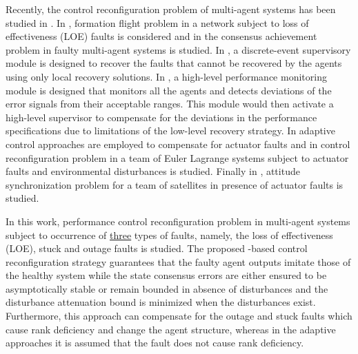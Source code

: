 \documentclass[12pt,draftcls,onecolumn]{IEEEtran}
\begin{document}
Recently, the control reconfiguration problem of multi-agent systems has been studied in  \cite{Tousi2012,Azizi11,ACC2014,ECC2014,Zhou2014,Zhao2014,Chen2014,Wang2015-2,Wang2015-3,Mehrabian2011,Mehrabian2011-2,Li2012,Xiao2013}. In \cite{Tousi2012,Azizi11}, formation flight problem in a network subject to loss of effectiveness (LOE) faults is considered and in  \cite{ACC2014,ECC2014,Zhou2014} the consensus achievement problem in faulty multi-agent systems is studied.  In  \cite{Tousi2012}, a discrete-event supervisory module is designed to recover the faults that cannot be recovered by the agents using only local recovery solutions. In \cite{Azizi11}, a  high-level performance monitoring  module is designed  that monitors all the agents and detects deviations of the error signals from their acceptable ranges. This module would then activate a high-level supervisor to compensate for the deviations in the performance specifications due to limitations of the low-level recovery strategy. In \cite{Zhao2014,Chen2014,Wang2015-2,Wang2015-3} adaptive control approaches are employed to compensate for actuator faults and in \cite{Mehrabian2011,Mehrabian2011-2} control reconfiguration problem in a team of Euler Lagrange systems subject to actuator faults and environmental disturbances is studied. Finally in \cite{Li2012,Xiao2013},  attitude synchronization problem for a team of satellites in presence of actuator faults is studied.  \par

In this work,   performance  control reconfiguration problem in multi-agent systems subject to occurrence of \underline{three} types of faults, namely, the loss of effectiveness (LOE), stuck and outage faults is studied. 
The proposed -based control reconfiguration  strategy  guarantees that the faulty agent outputs imitate those of the healthy system while  the state consensus errors are either ensured to be asymptotically stable or  remain bounded 
 in  absence of disturbances and  the disturbance attenuation bound is minimized when the disturbances exist. {Furthermore, this approach can compensate for the outage and stuck faults which cause rank deficiency and change the agent structure, whereas in the adaptive approaches it is assumed that the fault does not cause rank deficiency.  }
 
\end{document}
